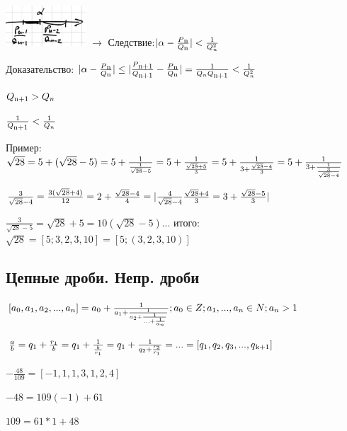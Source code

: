 \documentclass[12pt]{article}
\begin{document}
            \includegraphics[width=30mm]{image1.png}
        $\rightarrow$ Следствие:$ |\alpha - \frac{P\textsubscript{n}}{Q\textsubscript{n}}| < \frac{1}{Q^2_n}$

            Доказательство: $|\alpha - \frac{P\textsubscript{n}}{Q\textsubscript{n}}| \leq |\frac{P\textsubscript{n+1}}{Q\textsubscript{n+1}} - \frac{P\textsubscript{n}}{Q\textsubscript{n}}| = \frac{1}{Q_n Q\textsubscript{n+1}} < \frac{1}{Q^2_n}  \vspace{2 ex}$

$Q\textsubscript{n+1} > Q_n$

$\frac{1}{Q\textsubscript{n+1}} < \frac{1}{Q_n} $

            Пример:
        $\sqrt{28} = 5 + (\sqrt{28} -5) = 5 + \frac{1}{\frac{1}{\sqrt{28} - 5}} = 5 + \frac{1}{\frac{\sqrt{28} + 5}{3}} =  5 + \frac{1}{3 + \frac{\sqrt{28}-4}{3}} = 5 + \frac{1}{3 + \frac{1}{\frac{3}{\sqrt{28}-4}}} \vspace{1 ex}$

$\frac{3}{\sqrt{28} -4} = \frac{3(\sqrt{28} + 4)}{12} = 2 + \frac{\sqrt{28} - 4}{4} =|\frac{4}{\sqrt{28} - 4} \frac{\sqrt{28} + 4}{3} = 3 + \frac{\sqrt{28} - 5}{3}| \vspace{1 ex}$

$\frac{3}{\sqrt{28} -5} = \sqrt{28} + 5 = 10 (\sqrt{28} - 5)...$ итого: $\sqrt{28} = [5;3,2,3,10] = [5;(3,2,3,10)]$

            \subsection{Цепные дроби. Непр. дроби}

        $[a_0,a_1,a_2,...,a_n] = a_0 + \frac{1}{a_1 + \frac{1}{a_2 + \frac{1}{... + \frac{1}{a_n}}}}; a_0 \in Z; a_1,...,a_n \in N; a_n > 1
        \vspace{1 ex}$

$\frac{a}{b} = q_1 + \frac{r_1}{b} = q_1 + \frac{1}{\frac{b}{r_1}} = q_1 + \frac{1}{q_2 + \frac{r_2}{r_1}} = ... = [q_1,q_2,q_3,...,q\textsubscript{k+1}] \vspace{2 ex}$

$-\frac{48}{109} = [-1,1,1,3,1,2,4] $

$-48 = 109(-1) + 61$

$109 = 61*1 +48$
\end{document}
